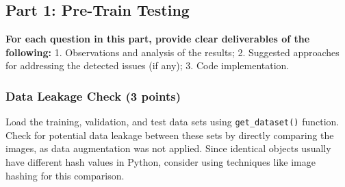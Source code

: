 \documentclass[11pt, oneside]{article}   	%
\begin{document}
\subsection*{Part 1: Pre-Train Testing}

\textbf{For each question in this part, provide clear deliverables of the following:} 1. Observations and analysis of the results; 2. Suggested approaches for addressing the detected issues (if any); 3. Code implementation.

\subsubsection*{Data Leakage Check (3 points)}
Load the training, validation, and test data sets using \texttt{get\_dataset()} function. Check for potential data leakage between these sets by directly comparing the images, as data augmentation was not applied. Since identical objects usually have different hash values in Python, consider using techniques like image hashing for this comparison.
\end{document}
